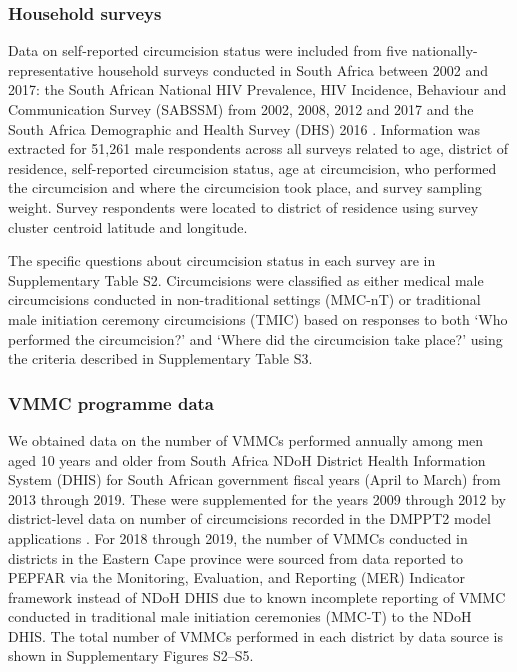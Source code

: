 \documentclass{article}
\begin{document}

\subsubsection*{Household surveys}


Data on self-reported circumcision status were included from five nationally-representative household surveys conducted in South Africa between 2002 and 2017: the South African National HIV Prevalence, HIV Incidence, Behaviour and Communication Survey (SABSSM) from 2002, 2008, 2012 and 2017 \autocite{hsrc2017, hsrc2012, hsrc2008, hsrc2002} and the South Africa Demographic and Health Survey (DHS) 2016 \autocite{dhs2016}. Information was extracted for 51,261 male respondents across all surveys related to age, district of residence, self-reported circumcision status, age at circumcision, who performed the circumcision and where the circumcision took place, and survey sampling weight. Survey respondents were located to district of residence using survey cluster centroid latitude and longitude.

The specific questions about circumcision status in each survey are in Supplementary Table S2. Circumcisions were classified as either medical male circumcisions conducted in non-traditional settings (MMC-nT) or traditional male initiation ceremony circumcisions (TMIC) based on responses to both `Who performed the circumcision?' and `Where did the circumcision take place?' using the criteria described in Supplementary Table S3.


\subsubsection*{VMMC programme data}


We obtained data on the number of VMMCs performed annually among men aged 10 years and older from South Africa NDoH District Health Information System (DHIS) for South African government fiscal years (April to March) from 2013 through 2019. These were supplemented for the years 2009 through 2012 by district-level data on number of circumcisions recorded in the DMPPT2 model applications \autocite{kripke2016age, kripke2016cost}. For 2018 through 2019, the number of VMMCs conducted in districts in the Eastern Cape province were sourced from data reported to PEPFAR via the Monitoring, Evaluation, and Reporting (MER) Indicator framework instead of NDoH DHIS due to known incomplete reporting of VMMC conducted in traditional male initiation ceremonies (MMC-T) to the NDoH DHIS. The total number of VMMCs performed in each district by data source is shown in Supplementary Figures S2--S5.
\end{document}
